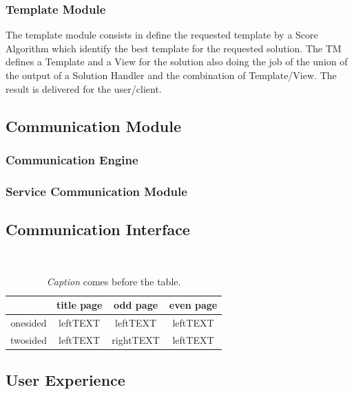 \documentclass[3p,times]{elsarticle}
\begin{document}
\subsubsection{Template Module}
\label{template_module}

The template module consists in define the requested template by a Score Algorithm which identify the best template for the requested solution.
The TM defines a Template and a View for the solution also doing the job of the union of the output of a Solution Handler and the combination of Template/View. The result is delivered for the user/client.

\subsection{Communication Module}
\label{communication_module}

\subsubsection{Communication Engine}
\label{communication_engine}

\subsubsection{Service Communication Module}
\label{service_communication_module}


\subsection{Communication Interface}
\label{communication_interface}

\begin{table}[htb]
	\caption{\label{tabela}\textit{Caption} comes before the table.}
	\begin{center}
		{\tt
			\begin{tabular}{|c||c|c|c|}\hline
				         & title page & odd page  & even page \\\hline\hline
				onesided & leftTEXT   & leftTEXT  & leftTEXT  \\\hline
				twosided & leftTEXT   & rightTEXT & leftTEXT  \\\hline
			\end{tabular}
		}
	\end{center}
\end{table}

\subsection{User Experience} %
\label{ux_layer}
\end{document}
